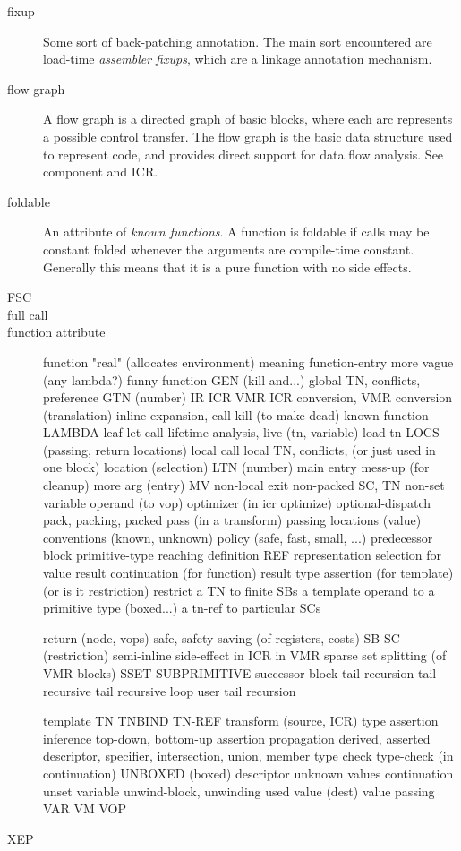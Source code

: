 \begin{description}
\item[fixup]  Some sort of back-patching annotation.  The main sort encountered
are load-time {\it assembler fixups}, which are a linkage annotation mechanism.

\item[flow graph] A flow graph is a directed graph of basic blocks, where each
arc represents a possible control transfer.  The flow graph is the basic data
structure used to represent code, and provides direct support for data flow
analysis.  See component and ICR.

\item[foldable] An attribute of {\it known functions}.  A function is foldable
if calls may be constant folded whenever the arguments are compile-time
constant.  Generally this means that it is a pure function with no side
effects.


\item[FSC]
\item[full call]
\item[function attribute]
function
        "real" (allocates environment)
        meaning function-entry
        more vague (any lambda?)
funny function
GEN (kill and...)
global TN, conflicts, preference
GTN (number)
IR ICR VMR  ICR conversion, VMR conversion (translation)
inline expansion, call
kill (to make dead)
known function
LAMBDA
leaf
let call
lifetime analysis, live (tn, variable)
load tn
LOCS (passing, return locations)
local call
local TN, conflicts, (or just used in one block)
location (selection)
LTN (number)
main entry
mess-up (for cleanup)
more arg (entry)
MV
non-local exit
non-packed SC, TN
non-set variable
operand (to vop)
optimizer (in icr optimize)
optional-dispatch
pack, packing, packed
pass (in a transform)
passing 
        locations (value)
        conventions (known, unknown)
policy (safe, fast, small, ...)
predecessor block
primitive-type
reaching definition
REF
representation
        selection
        for value
result continuation (for function)
result type assertion (for template) (or is it restriction)
restrict
        a TN to finite SBs
        a template operand to a primitive type (boxed...)
        a tn-ref to particular SCs

return (node, vops)
safe, safety
saving (of registers, costs)
SB
SC (restriction)
semi-inline
side-effect
        in ICR
        in VMR
sparse set
splitting (of VMR blocks)
SSET
SUBPRIMITIVE
successor block
tail recursion
        tail recursive
        tail recursive loop
        user tail recursion

template
TN
TNBIND
TN-REF
transform (source, ICR)
type
        assertion
        inference
                top-down, bottom-up
        assertion propagation
        derived, asserted
        descriptor, specifier, intersection, union, member type
        check
type-check (in continuation)
UNBOXED (boxed) descriptor
unknown values continuation
unset variable
unwind-block, unwinding
used value (dest)
value passing
VAR
VM
VOP
\item[XEP]

\end{description}
